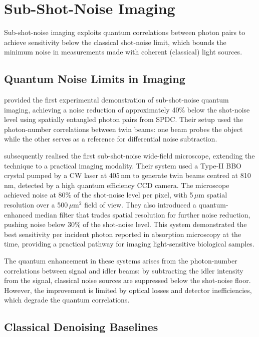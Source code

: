 \section{Sub-Shot-Noise Imaging}
\label{sec:sub_shot_noise}

Sub-shot-noise imaging exploits quantum correlations between photon pairs to achieve sensitivity below the classical shot-noise limit, which bounds the minimum noise in measurements made with coherent (classical) light sources.

\subsection{Quantum Noise Limits in Imaging}

\citet{brida2010} provided the first experimental demonstration of sub-shot-noise quantum imaging, achieving a noise reduction of approximately 40\% below the shot-noise level using spatially entangled photon pairs from SPDC. Their setup used the photon-number correlations between twin beams: one beam probes the object while the other serves as a reference for differential noise subtraction.

\citet{samantaray2017} subsequently realised the first sub-shot-noise wide-field microscope, extending the technique to a practical imaging modality. Their system used a Type-II BBO crystal pumped by a CW laser at 405\,nm to generate twin beams centred at 810\,nm, detected by a high quantum efficiency CCD camera. The microscope achieved noise at 80\% of the shot-noise level per pixel, with 5\,$\mu$m spatial resolution over a 500\,$\mu$m$^2$ field of view. They also introduced a quantum-enhanced median filter that trades spatial resolution for further noise reduction, pushing noise below 30\% of the shot-noise level. This system demonstrated the best sensitivity per incident photon reported in absorption microscopy at the time, providing a practical pathway for imaging light-sensitive biological samples.

The quantum enhancement in these systems arises from the photon-number correlations between signal and idler beams: by subtracting the idler intensity from the signal, classical noise sources are suppressed below the shot-noise floor. However, the improvement is limited by optical losses and detector inefficiencies, which degrade the quantum correlations.

\subsection{Classical Denoising Baselines}

